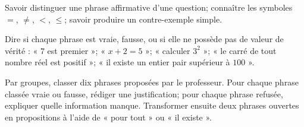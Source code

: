\begin{prerequis}
Savoir distinguer une phrase affirmative d'une question; connaître les symboles
$=$, $\ne$, $<$, $\leq$; savoir produire un contre-exemple simple.
\end{prerequis}
\begin{automatismes}
Dire si chaque phrase est vraie, fausse, ou si elle ne possède pas de valeur de
vérité : « $7$ est premier »; « $x+2=5$ »; « calculer $3^2$ »; « le carré de
tout nombre réel est positif »; « il existe un entier pair supérieur à $100$ ».
\end{automatismes}
\begin{activite}
Par groupes, classer dix phrases proposées par le professeur. Pour chaque phrase
classée vraie ou fausse, rédiger une justification; pour chaque phrase refusée,
expliquer quelle information manque. Transformer ensuite deux phrases ouvertes
en propositions à l'aide de « pour tout » ou « il existe ».
\end{activite}

